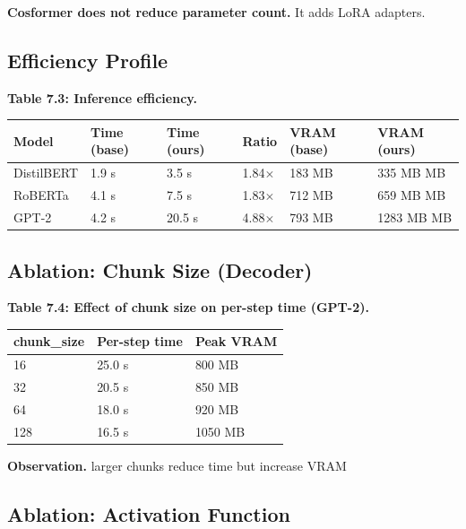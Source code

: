 \textbf{Cosformer does not reduce parameter count.} It adds LoRA adapters.

\subsection{Efficiency Profile}

\textbf{Table 7.3: Inference efficiency.}

\begin{table}[H]
\centering
\small
\begin{tabular}{llllll}
\toprule
\textbf{Model} & \textbf{Time (base)} & \textbf{Time (ours)} & \textbf{Ratio} & \textbf{VRAM (base)} & \textbf{VRAM (ours)} \\
\midrule
DistilBERT & 1.9 s & 3.5 s & 1.84$\times$ & 183 MB & 335 MB MB \\
RoBERTa & 4.1 s & 7.5 s & 1.83$\times$ & 712 MB & 659 MB MB \\
GPT-2 & 4.2 s & 20.5 s & 4.88$\times$ & 793 MB & 1283 MB MB \\
\bottomrule
\end{tabular}
\end{table}

\subsection{Ablation: Chunk Size (Decoder)}

\textbf{Table 7.4: Effect of chunk size on per-step time (GPT-2).}

\begin{table}[H]
\centering
\small
\begin{tabular}{lll}
\toprule
\textbf{chunk\_size} & \textbf{Per-step time} & \textbf{Peak VRAM} \\
\midrule
16 & 25.0 s & 800 MB \\
32 & 20.5 s & 850 MB \\
64 & 18.0 s & 920 MB \\
128 & 16.5 s & 1050 MB \\
\bottomrule
\end{tabular}
\end{table}

\textbf{Observation.} larger chunks reduce time but increase VRAM

\subsection{Ablation: Activation Function}

